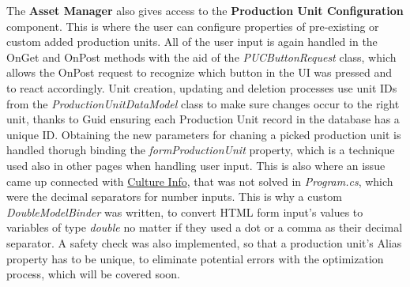 \documentclass[12pt]{report}
\begin{document}
The \textbf{Asset Manager} also gives access to the \textbf{Production Unit Configuration} component. This is where the user
can configure properties of pre-existing or custom added production units. All of the user input is again handled in the OnGet and OnPost methods
with the aid of the \textit{PUCButtonRequest} class, which allows the OnPost request to recognize which button in the UI was pressed
and to react accordingly. Unit creation, updating and deletion processes use unit IDs from the \textit{ProductionUnitDataModel} class
to make sure changes occur to the right unit, thanks to Guid ensuring each Production Unit record in the database has a unique ID.
Obtaining the new parameters for chaning a picked production unit is handled thorugh binding the \textit{formProductionUnit} property, which is
a technique used also in other pages when handling user input. This is also where an issue came up connected with
\underline{Culture Info}, that was not solved in \textit{Program.cs}, which were the decimal separators for number inputs.
This is why a custom \textit{DoubleModelBinder} was written, to convert HTML form input's values to variables of type \textit{double}
no matter if they used a dot or a comma as their decimal separator. A safety check was also implemented, so that a production
unit's Alias property has to be unique, to eliminate potential errors with the optimization process, which will be covered soon.


\end{document}

